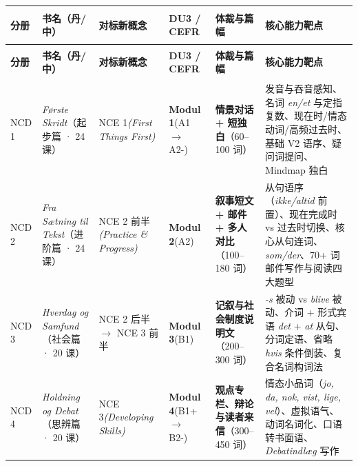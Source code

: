 \documentclass[10.5pt, a4paper]{ctexart}
\begin{document}
\renewcommand{\arraystretch}{1.35}
{\small
\renewcommand{\arraystretch}{1.3}
\begin{longtable}{@{} >{\bfseries\raggedright\arraybackslash}p{1.2cm} >{\raggedright\arraybackslash}p{2.9cm} >{\raggedright\arraybackslash}p{2.1cm} >{\raggedright\arraybackslash}p{2.0cm} >{\raggedright\arraybackslash}p{2.9cm} >{\raggedright\arraybackslash}p{4.3cm} @{}}
\toprule
\textbf{分册} & \textbf{书名（丹/中）} & \textbf{对标新概念} & \textbf{DU3 / CEFR} & \textbf{体裁与篇幅} & \textbf{核心能力靶点} \\
\midrule
\endfirsthead
\toprule
\textbf{分册} & \textbf{书名（丹/中）} & \textbf{对标新概念} & \textbf{DU3 / CEFR} & \textbf{体裁与篇幅} & \textbf{核心能力靶点} \\
\midrule
\endhead
\bottomrule
\endfoot
NCD 1 & \textit{Første Skridt}\newline （起步篇 · 24 课） & NCE 1\newline \textit{(First Things First)} & \textbf{Modul 1}\newline (A1 $\rightarrow$ A2-) & \textbf{情景对话 + 短独白}\newline （60--100 词） & 发音与吞音感知、名词 \textit{en/et} 与定指复数、现在时/情态动词/高频过去时、基础 V2 语序、疑问词提问、Mindmap 独白 \\
NCD 2 & \textit{Fra Sætning til Tekst}\newline （进阶篇 · 24 课） & NCE 2 前半\newline \textit{(Practice \& Progress)} & \textbf{Modul 2}\newline (A2) & \textbf{叙事短文 + 邮件 + 多人对比}\newline （100--180 词） & 从句语序（\textit{ikke/altid} 前置）、现在完成时 vs 过去时切换、核心从句连词、\textit{som/der}、70+ 词邮件写作与阅读四大题型 \\
NCD 3 & \textit{Hverdag og Samfund}\newline （社会篇 · 20 课） & NCE 2 后半 $\rightarrow$ NCE 3 前半 & \textbf{Modul 3}\newline (B1) & \textbf{记叙与社会制度说明文}\newline （200--300 词） & \textit{-s} 被动 vs \textit{blive} 被动、介词 + 形式宾语 \textit{det} + \textit{at} 从句、分词定语、省略 \textit{hvis} 条件倒装、复合名词构词法 \\
NCD 4 & \textit{Holdning og Debat}\newline （思辨篇 · 20 课） & NCE 3\newline \textit{(Developing Skills)} & \textbf{Modul 4}\newline (B1+ $\rightarrow$ B2-) & \textbf{观点专栏、辩论与读者来信}\newline （300--450 词） & 情态小品词（\textit{jo, da, nok, vist, lige, vel}）、虚拟语气、动词名词化、口语转书面语、\textit{Debatindlæg} 写作 \\

\end{longtable}}
\end{document}
